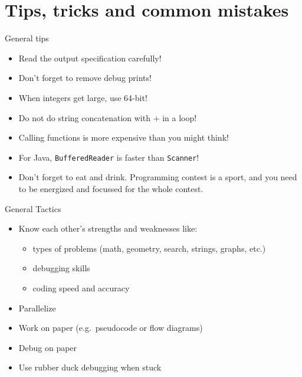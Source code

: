\documentclass[11pt,pdf, aspectratio=169]{beamer}
\begin{document}
  \section{Tips, tricks and common mistakes}
  \begin{frame}{General tips}
    \begin{itemize}
      \item Read the output specification carefully!
      \item Don't forget to remove debug prints!
      \item When integers get large, use 64-bit!
      \item Do not do string concatenation with $+$ in a loop!
      \item Calling functions is more expensive than you might think!
      \item For Java, \texttt{BufferedReader} is faster than \texttt{Scanner}!
      \item Don't forget to eat and drink.
      Programming contest is a sport, and you need to be energized and focussed for the whole contest.
    \end{itemize}
  \end{frame}
  \begin{frame}{General Tactics}
    \begin{itemize}
      \item Know each other's strengths and weaknesses like:
      \begin{itemize}
        \item types of problems (math, geometry, search, strings, graphs, etc.)
        \item debugging skills
        \item coding speed and accuracy
      \end{itemize}
      \item Parallelize
      \item Work on paper (e.g.\ pseudocode or flow diagrams)
      \item Debug on paper
      \item Use rubber duck debugging when stuck
    \end{itemize}
  \end{frame}
\end{document}
